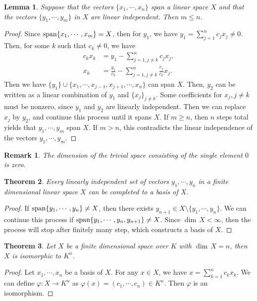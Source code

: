 \documentclass[11pt]{book}
\newtheorem{theorem}{Theorem}[chapter]
\newtheorem{lemma}[theorem]{Lemma}
\newtheorem{remark}{Remark}[chapter]
\theoremstyle{definition}
\numberwithin{equation}{chapter}
\begin{document}
\medskip

\begin{lemma}
Suppose that the vectors $\{x_1,\cdots,x_n\}$ span a linear space $X$ and that
the vectors $\{y_1,\cdots,y_m\}$ in $X$ are linear independent. Then $m \leq n$.
\end{lemma}
\begin{proof}
Since ${\rm span}\{x_1,\cdots,x_m\} = X$, then for $y_1$, we have $y_1 = \sum^n_{j=1}c_j x_j \neq 0$. Then, for some $k$ such that $c_k\neq 0$, we have
\begin{align*}
    c_k x_k & = y_1 - \sum^n_{j=1, j\neq k} c_j x_j, \\
    x_k & = \frac{y_1}{c_k} - \sum^n_{j=1, j\neq k} \frac{c_j}{c_k} x_j.
\end{align*}
Then we have $\{y_1\}\cup\{x_1,\cdots,x_{j-1},x_{j+1},\cdots, x_n\}$ can span $X$. Then, $y_2$ can be written as a linear combination of $y_1$ and $\{x_j\}_{j\neq k}$. Some coefficients for $x_j, j\neq k$ must be nonzero, since $y_1$ and $y_2$ are linearly independent. Then we can replace $x_j$ by $y_2$, and continue this process until it spans $X$. If $m \geq n$, then $n$ steps total yields that $y_1,\cdots,y_m$ span $X$. If $m > n$, this contradicts the linear independence of the vectors $y_1,\cdots,y_m$.
\end{proof}

\begin{remark}
The dimension of the trivial space consisting of the single element $0$ is zero.
\end{remark}

\medskip

\begin{theorem}
Every linearly independent set of vectors $y_1,\cdots,y_n$ in a finite dimensional linear space $X$ can be completed to a basis of $X$.
\end{theorem}
\begin{proof}
If ${\rm span}\{y_1,\cdots,y_n\} \neq X$, then there exists $y_{n+1}\in X \setminus \{y_1,\cdots,y_n\}$. We can continue this process if ${\rm span}\{y_1,\cdots,y_n, y_{n+1}\}\neq X$. Since $ \dim \,X < \infty$, then the process will stop after finitely many step, which  constructs a basis of $X$.
\end{proof}

\medskip

\begin{theorem}
Let $X$ be a finite dimensional space over $K$ with $ \dim \,X = n$, then $X$ is isomorphic to $K^n$.
\end{theorem}
\begin{proof}
Let $x_1, \cdots, x_n$ be a basis of $X$. For any $x\in X$, we have $x = \sum^n_{k=1}c_k x_k$. We can define $\varphi: X\to K^n$ as $\varphi(x) = (c_1, \cdots, c_n) \in K^n$. Then $\varphi$ is an isomorphism.
\end{proof}
\end{document}
